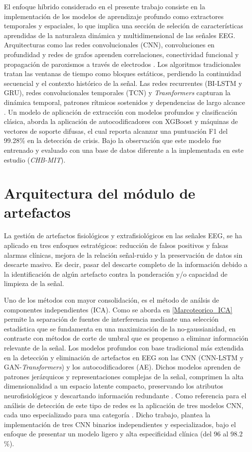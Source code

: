 El enfoque híbrido considerado en el presente trabajo consiste en la implementación de los modelos de aprendizaje profundo como extractores temporales y espaciales, lo que implica una sección de seleción de características aprendidas de la naturaleza dinámica y multidimensional de las señales EEG. Arquitecturas como las redes convolucionales (CNN), convoluciones en profundidad y redes de grafos aprenden correlaciones, conectividad funcional y propagación de paroxismos a través de electrodos \cite{Lawhern2018EEGNet}.
Los algoritmos tradicionales tratan las ventanas de tiempo como bloques estáticos, perdiendo la continuidad secuencial y el contexto histórico de la señal.
Las redes recurrentes (BI-LSTM y GRU), redes convolucionales temporales (TCN) y \textit{Trasnformers} capturan la dinámica temporal, patrones rítmicos sostenidos y dependencias de largo alcance \cite{sahatchindaDiagnosisEpilepticSeizures2025}.
Un modelo de aplicación de extracción con modelos profundos y clasificación clásica, aborda la aplicación de autocodificadores con XGBoost y máquinas de vectores de soporte difusas, el cual reporta alcanzar una puntuación F1 del 99.28\% en la detección de crisis.
Bajo la observación que este modelo fue entrenado y evaluado con una base de datos diferente a la implementada en este estudio (\textit{CHB-MIT}).

\section{Arquitectura del módulo de artefactos}
La gestión de artefactos fisiológicos y extrafisiológicos en las señales EEG, se ha aplicado en tres enfoques estratégicos: reducción de falsos positivos y falsas alarmas clínicas, mejora de la relación señal-ruido y la preservación de datos sin descarte masivo.
Es decir, pasar del descarte completo de la información debido a la identificación de algún artefacto contra la ponderación y/o capacidad de limpieza de la señal.

Uno de los métodos con mayor consolidación, es el método de análsis de componentes independientes (ICA). Como se aborda en \ref{Marcoteorico_ICA} permite la separación de fuentes de interferencia mediante una selección estadística que se fundamenta en una maximización de la no-gaussianidad, en contraste con métodos de corte de umbral que es propenso a eliminar información relevante de la señal.
Los modelos profundos con base tradicional más extendida en la detección y eliminación de artefactos en EEG son las CNN (CNN-LSTM y GAN-\textit{Transformers}) y los autocodificadores (AE). Dichos modelos aprenden de patrones jerárquicos y representaciones complejas de la señal, comprimen la alta dimensionalidad a un espacio latente compacto, preservando los atributos neurofisiológicos y descartando información redundante \cite{mouazenTransparentEEGAnalysis2025}. 
Como referencia para el análisis de detección de este tipo de redes es la aplicación de tres modelos CNN, cada uno especializado para una categoría \cite{Nyanney2026ArtifactsCNN}.
Dicho trabajo, plantea la implementación de tres CNN binarios independientes y especializados, bajo el enfoque de presentar un modelo ligero y alta especificidad clínica (del 96 al 98.2 \%).

